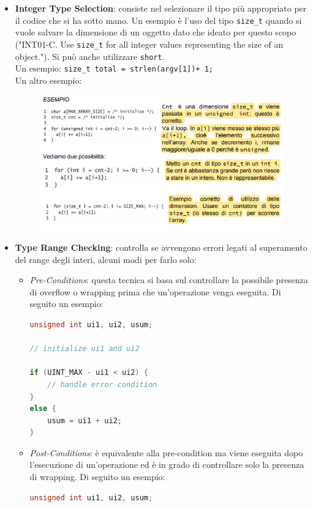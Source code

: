 \begin{itemize}
    \item \textbf{Integer Type Selection}:
          consiste nel selezionare il tipo più
          appropriato per il codice che si ha sotto mano.
          Un esempio è l'uso del tipo \verb|size_t| quando si vuole salvare la
          dimensione di un oggetto dato che ideato per questo scopo
          ("INT01-C. Use \verb|size_t| for all integer values representing the size of
          an object.").
          Si può anche utilizzare \verb|short|.\\
          Un esempio: \verb|size_t total = strlen(argv[1])+ 1;|\\
          Un altro esempio:
          \begin{figure}[H]
              \centering
              \includegraphics[width=12cm, keepaspectratio]{capitoli/secure_coding/img/cap_2/esempio_sizet.png}
          \end{figure}

    \item \textbf{Type Range Checking}:
          controlla se avvengono errori legati al superamento del range degli interi,
          alcuni modi per farlo solo: \begin{itemize}
              \item \textit{Pre-Conditions}:
                    questa tecnica si basa sul controllare la possibile presenza di
                    overflow o wrapping prima che un'operazione venga eseguita.
                    Di seguito un esempio:
                    \begin{lstlisting}[language=C]
unsigned int ui1, ui2, usum;

// initialize ui1 and ui2

if (UINT_MAX - ui1 < ui2) {
    // handle error condition
}
else {
    usum = ui1 + ui2;
}
                    \end{lstlisting}
              \item \textit{Post-Conditions}:
                    è equivalente alla pre-condition ma viene eseguita dopo
                    l'esecuzione di un'operazione ed è in grado di controllare solo la
                    presenza di wrapping. Di seguito un esempio:
                    \begin{lstlisting}[language=C]
    unsigned int ui1, ui2, usum;


\end{lstlisting}
\end{itemize}
\end{itemize}
